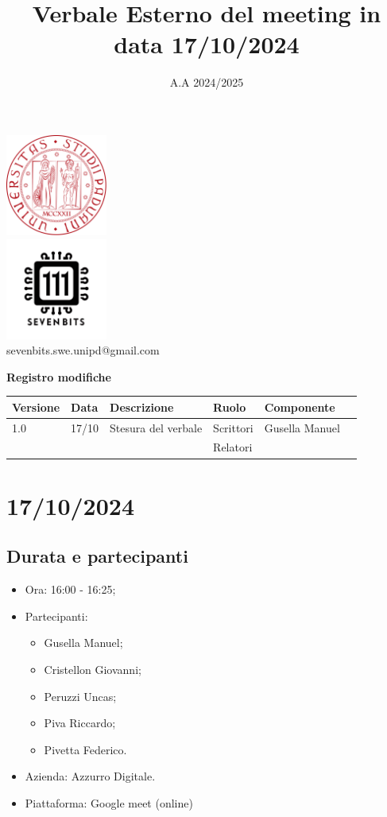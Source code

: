 \documentclass[12pt]{article}
\title{Verbale Esterno del meeting in data 17/10/2024}
\date{A.A 2024/2025}
\begin{document}
\maketitle
\center 
\includegraphics[width=0.25\textwidth]{LogoUnipd}\\
\includegraphics[width=0.25\textwidth]{Sevenbitslogo}\\
sevenbits.swe.unipd@gmail.com\\
\vspace{2mm}

\textbf{Registro modifiche}\\
\vspace{2mm}
\begin{tabular}{|l|l|l|l|l|l|}
\hline
\textbf{Versione} & \textbf{Data} & \textbf{Descrizione} & \textbf{Ruolo} & \textbf{Componente} \\
\hline
1.0 & 17/10 & Stesura del verbale & Scrittori & Gusella Manuel\\
\hline
& & & Relatori & \\
\hline
\end{tabular}

\raggedright
\tableofcontents
\newpage
\section{17/10/2024}
\subsection{Durata e partecipanti}
\begin{itemize}
\item Ora: 16:00 - 16:25;
\item Partecipanti: 	
	\begin{itemize}
	\item Gusella Manuel;
	\item Cristellon Giovanni;
	\item Peruzzi Uncas;
	\item Piva Riccardo;
	\item Pivetta Federico.
	\end{itemize}
\item Azienda: Azzurro Digitale.
\item Piattaforma: Google meet (online)
\end{itemize}
\end{document}

